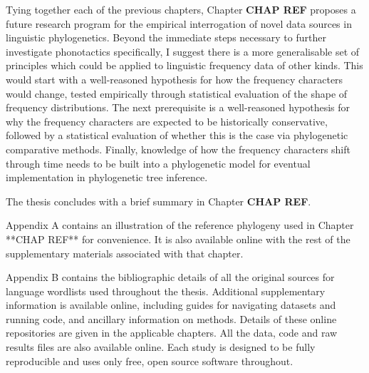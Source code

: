 Tying together each of the previous chapters, Chapter \textbf{CHAP REF} proposes a future research program for the empirical interrogation of novel data sources in linguistic phylogenetics. Beyond the immediate steps necessary to further investigate phonotactics specifically, I suggest there is a more generalisable set of principles which could be applied to linguistic frequency data of other kinds. This would start with a well-reasoned hypothesis for how the frequency characters would change, tested empirically through statistical evaluation of the shape of frequency distributions. The next prerequisite is a well-reasoned hypothesis for why the frequency characters are expected to be historically conservative, followed by a statistical evaluation of whether this is the case via phylogenetic comparative methods. Finally, knowledge of how the frequency characters shift through time needs to be built into a phylogenetic model for eventual implementation in phylogenetic tree inference.

The thesis concludes with a brief summary in Chapter \textbf{CHAP REF}.

Appendix A contains an illustration of the reference phylogeny used in Chapter **CHAP REF** for convenience. It is also available online with the rest of the supplementary materials associated with that chapter.

Appendix B contains the bibliographic details of all the original sources for language wordlists used throughout the thesis. Additional supplementary information is available online, including guides for navigating datasets and running code, and ancillary information on methods. Details of these online repositories are given in the applicable chapters. All the data, code and raw results files are also available online. Each study is designed to be fully reproducible and uses only free, open source software throughout.

